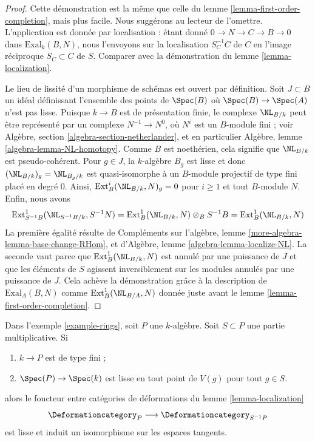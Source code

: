 \begin{proof}
Cette démonstration est la même que celle du
lemme \ref{lemma-first-order-completion}, mais plus facile. Nous suggérons au
lecteur de l'omettre.
L'application est donnée par localisation : étant donné $0 \to N \to C \to B \to 0$
dans $\text{Exal}_k(B, N)$, nous l'envoyons sur la localisation $S_C^{-1}C$
de $C$ en l'image réciproque $S_C \subset C$ de $S$.
Comparer avec la démonstration du lemme \ref{lemma-localization}.

\medskip\noindent
Le lieu de lissité d'un morphisme de schémas est ouvert par définition.
Soit $J \subset B$ un idéal définissant l'ensemble des points
de $\Spec(B)$ où $\Spec(B) \to \Spec(A)$ n'est pas lisse.
Puisque $k \to B$ est de présentation finie, le complexe
$\NL_{B/k}$ peut être représenté par un complexe
$N^{-1} \to N^0$, où $N^i$ est un $B$-module fini ; voir
Algèbre, section \ref{algebra-section-netherlander}, et
en particulier
Algèbre, lemme \ref{algebra-lemma-NL-homotopy}.
Comme $B$ est noethérien, cela signifie que $\NL_{B/k}$
est pseudo-cohérent. Pour $g \in J$, la $k$-algèbre $B_g$
est lisse et donc $(\NL_{B/k})_g = \NL_{B_g/k}$
est quasi-isomorphe à un $B$-module projectif de type fini placé en degré $0$.
Ainsi, $\text{Ext}^i_B(\NL_{B/k}, N)_g = 0$ pour $i \geq 1$
et tout $B$-module $N$. Enfin, nous avons
$$
\text{Ext}^1_{S^{-1}B}(\NL_{S^{-1}B/k}, S^{-1}N) =
\text{Ext}^1_B(\NL_{B/k}, N) \otimes_B S^{-1}B =
\text{Ext}^1_B(\NL_{B/k}, N)
$$
La première égalité résulte de
Compléments sur l'algèbre, lemme \ref{more-algebra-lemma-base-change-RHom},
et d'Algèbre, lemme \ref{algebra-lemma-localize-NL}.
La seconde vaut parce que $\text{Ext}^1_B(\NL_{B/k}, N)$ est annulé par une puissance de $J$
et que les éléments de $S$ agissent inversiblement sur les modules annulés par une puissance de $J$.
Cela achève la démonstration grâce à la description de $\text{Exal}_A(B, N)$
comme $\text{Ext}^1_B(\NL_{B/A}, N)$ donnée juste avant le
lemme \ref{lemma-first-order-completion}.
\end{proof}

\begin{lemma}
\label{lemma-smooth-localization}
Dans l'exemple \ref{example-rings}, soit $P$ une $k$-algèbre.
Soit $S \subset P$ une partie multiplicative. Si
\begin{enumerate}
\item $k \to P$ est de type fini ;
\item $\Spec(P) \to \Spec(k)$ est lisse en tout point de
$V(g)$ pour tout $g \in S$.
\end{enumerate}
alors le foncteur entre catégories de déformations du
lemme \ref{lemma-localization}
$$
\Deformationcategory_P \longrightarrow \Deformationcategory_{S^{-1}P}
$$
est lisse et induit un isomorphisme sur les espaces tangents.
\end{lemma}

